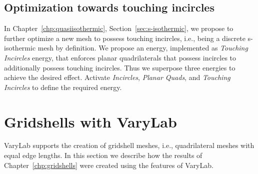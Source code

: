 \documentclass[Thesis.tex]{subfiles}
\begin{document}
\begin{compactenum}[(1)]
\begin{center}
\begin{minipage}{\linewidth}
            \centering
\end{minipage}
\end{center}    
            
\end{compactenum}

\subsection{Optimization towards touching incircles}

In Chapter~\ref{chp:quasiisothermic}, Section~\ref{sec:s-isothermic}, we propose to further optimize a new mesh to possess touching incircles, i.e., being a discrete s-isothermic mesh by definition. We propose an energy, implemented as \emph{Touching Incircles} energy, that enforces planar quadrilaterals that possess incircles to additionally possess touching incircles. Thus we superpose three energies to achieve the desired effect. Activate \emph{Incircles}, \emph{Planar Quads}, and \emph{Touching Incircles} to define the required energy.

\section{Gridshells with {\sc VaryLab}}
\label{sec:gridshells_varylab}

{\sc VaryLab} supports the creation of gridshell meshes, i.e., quadrilateral meshes with equal edge lengths. In this section we describe how the results of Chapter~\ref{chp:gridshells} were created using the features of {\sc VaryLab}.
\end{document}
